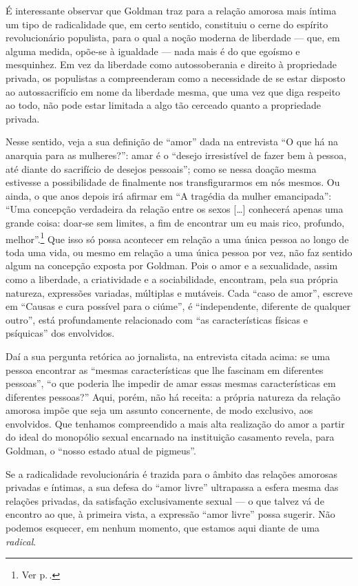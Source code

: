 É interessante observar que Goldman traz para a
relação amorosa mais íntima um tipo de radicalidade que, em certo
sentido, constituiu o cerne do espírito revolucionário populista, para o
qual a noção moderna de liberdade --- que, em alguma medida,
opõe-se à igualdade --- nada mais é do que egoísmo e mesquinhez. Em vez
da liberdade como autossoberania e direito à propriedade privada, os
populistas a compreenderam como a necessidade de se estar disposto ao
autossacrifício em nome da liberdade mesma, que uma vez que diga
respeito ao todo, não pode estar limitada a algo tão cerceado quanto a
propriedade privada.

Nesse sentido, veja a sua definição de ``amor''
dada na entrevista ``O que há na anarquia
para as mulheres?'': amar é o ``desejo irresistível de fazer bem à
pessoa, até diante do sacrifício de desejos pessoais''; como se nessa
doação mesma estivesse a possibilidade de finalmente nos transfigurarmos
em nós mesmos. Ou ainda, o que anos depois irá afirmar em ``A tragédia
da mulher emancipada'': ``Uma concepção verdadeira da relação entre os
sexos {[}\ldots{]} conhecerá apenas uma grande coisa: doar-se sem limites,
a fim de encontrar um eu mais rico, profundo, melhor''.\footnote{Ver p.\,\pageref{concepcao}.} Que isso só
possa acontecer em relação a uma única pessoa ao longo de toda uma
vida, ou mesmo em relação a uma única pessoa por vez, não faz sentido algum na
concepção exposta por Goldman. Pois o amor e a
sexualidade, assim como a liberdade, a criatividade e a sociabilidade,
encontram, pela sua própria natureza, expressões variadas, múltiplas e
mutáveis. Cada ``caso de amor'', escreve em ``Causas e cura possível
para o ciúme'', é ``independente, diferente de qualquer outro'', está
profundamente relacionado com ``as características físicas e psíquicas''
dos envolvidos.

Daí a sua pergunta retórica ao jornalista, na entrevista
citada acima: se uma pessoa encontrar as ``mesmas características que lhe
fascinam em diferentes pessoas'', ``o que poderia lhe impedir de amar
essas mesmas características em diferentes pessoas?'' Aqui, porém, não
há receita: a própria natureza da relação amorosa impõe que seja um
assunto concernente, de modo exclusivo, aos envolvidos. Que tenhamos
compreendido a mais alta realização do amor a partir do ideal do
monopólio sexual encarnado na instituição casamento revela, para
Goldman, o ``nosso estado atual de pigmeus''.

Se a radicalidade revolucionária é trazida para
o âmbito das relações amorosas privadas e íntimas, a sua
defesa do ``amor livre'' ultrapassa a esfera mesma das relações
privadas, da satisfação exclusivamente sexual --- o que talvez
vá de encontro ao que, à primeira vista, a expressão ``amor livre''
possa sugerir. Não podemos esquecer, em nenhum momento, que estamos aqui
diante de uma \emph{radical}.

